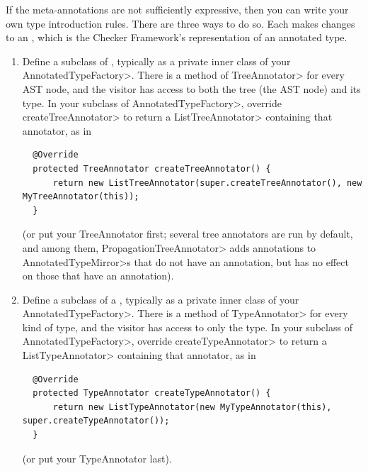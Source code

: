 
If the meta-annotations are not sufficiently expressive, then you
can write your own type introduction rules.  There are three ways to do so.
Each makes changes to an ,
which is the Checker Framework's representation of an annotated type.


\begin{enumerate}
\item
  Define a subclass of
  ,
  typically as a private inner class of your \<AnnotatedTypeFactory>.
  There is a method of \<TreeAnnotator> for every AST node, and the visitor
  has access to both the tree (the AST node) and its type.  In your
  subclass of \<AnnotatedTypeFactory>, override \<createTreeAnnotator> to
  return a \<ListTreeAnnotator> containing that annotator, as in

\begin{Verbatim}
  @Override
  protected TreeAnnotator createTreeAnnotator() {
      return new ListTreeAnnotator(super.createTreeAnnotator(), new MyTreeAnnotator(this));
  }
\end{Verbatim}

  \noindent
  (or put your TreeAnnotator first; several tree annotators are run by
  default, and among them, \<PropagationTreeAnnotator>
  adds annotations to \<AnnotatedTypeMirror>s that do not have an annotation,
  but has no effect on those that have an annotation).

\item
  Define a subclass of a
  ,
  typically as a private inner class of your \<AnnotatedTypeFactory>.
  There is a method of \<TypeAnnotator> for every kind of type, and the
  visitor has access to only the type.  In your subclass of
  \<AnnotatedTypeFactory>, override \<createTypeAnnotator> to return a
  \<ListTypeAnnotator> containing that annotator, as in

\begin{Verbatim}
  @Override
  protected TypeAnnotator createTypeAnnotator() {
      return new ListTypeAnnotator(new MyTypeAnnotator(this), super.createTypeAnnotator());
  }
\end{Verbatim}

  \noindent
  (or put your TypeAnnotator last).


\end{enumerate}
